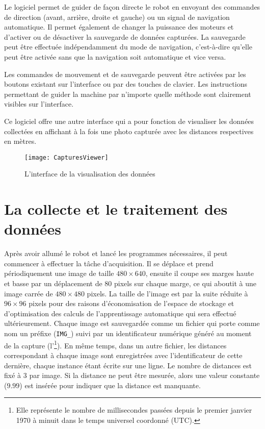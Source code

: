 Le logiciel permet de guider de façon directe le robot en envoyant des commandes
de direction (avant, arrière, droite et gauche) ou un signal de
navigation automatique. Il permet également de changer la puissance des moteurs
et d'activer ou de désactiver la sauvegarde de données capturées.
La sauvegarde peut être effectuée indépendamment
du mode de navigation, c'est-à-dire qu'elle peut être activée sans que la
navigation soit automatique et vice versa.

Les commandes de mouvement et de sauvegarde peuvent être activées par les
boutons existant sur l'interface ou par des touches de clavier. Les instructions
permettant de guider la machine par n'importe quelle méthode sont clairement visibles
sur l'interface.

Ce logiciel offre une autre interface qui a pour fonction de visualiser les
données collectées en affichant à la fois une photo capturée avec les distances
respectives en mètres.

\begin{figure}[H]
\begin{center}
\texttt{[image: CapturesViewer]}
\caption{L'interface de la visualisation des données}
\end{center}
\end{figure}

\section{La collecte et le traitement des données}

Après avoir allumé le robot et lancé les programmes nécessaires, il peut commencer
à effectuer la tâche d'acquisition. Il se déplace et prend périodiquement une image
de taille $480 \times 640$, ensuite il coupe ses marges haute et basse par un
déplacement de $80$ pixels sur chaque marge, ce qui aboutit à une image carrée
de $480 \times 480$ pixels. La taille de l'image est par la suite réduite à
$96 \times 96$ pixels pour des raisons d'économisation de l'espace de stockage
et d'optimisation des calculs de l'apprentissage automatique qui sera effectué
ultérieurement. Chaque image est sauvegardée comme un fichier qui porte comme
nom un préfixe (\texttt{IMG\_}) suivi par un identificateur numérique généré
au moment de la capture (l'\footnote{Elle représente le nombre de
millisecondes passées depuis le premier janvier 1970 à minuit dans le temps
universel coordonné (UTC).}). En même temps, dans un autre fichier, les distances
correspondant à chaque image sont enregistrées avec l'identificateur de cette
dernière, chaque instance étant écrite sur une ligne. Le nombre de distances
est fixé à $3$ par image. Si la distance ne peut être mesurée, alors une valeur
constante ($9.99$) est insérée pour indiquer que la distance est manquante.

